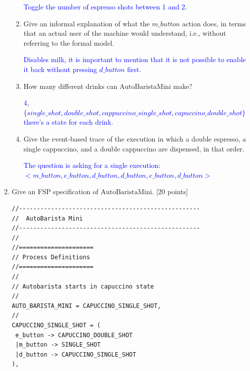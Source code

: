 \documentclass[12pt,fleqn]{article}
\begin{document}
\begin{enumerate}
\begin{enumerate}
\textcolor{blue}{Toggle the number of espresso shots between 1 and 2.}


\item Give an informal explanation of what the $m\_button$ action does, in terms that an actual user of the machine would understand, i.e., without referring to the formal model.

\textcolor{blue}{Disables milk, it is important to mention that it is not possible to enable it back without pressing $d\_button$ first.}


\item How many different drinks can $\mathrm{AutoBaristaMini}$ make?

\textcolor{blue}{4, $\{single\_shot, double\_shot, cappuccino\_single\_shot, capuccino\_double\_shot\}$ there's a state for each drink.}


\item Give the event-based trace of the execution in which a double espresso, a single cappuccino, and a double cappuccino are dispensed, in that order.

  \textcolor{blue}{The question is asking for a single execution: \\
    $<m\_button, e\_button, d\_button, d\_button, e\_button, d\_button>$
  }  
\end{enumerate}

\clearpage

\item Give an FSP specification of $\mathrm{AutoBaristaMini}$. [20 points]

\color{blue}
\begin{verbatim}
//---------------------------------------------------
//  AutoBarista Mini
//---------------------------------------------------
//
//=====================
// Process Definitions
//=====================
//
// Autobarista starts in capuccino state
//
AUTO_BARISTA_MINI = CAPUCCINO_SINGLE_SHOT,
//
CAPUCCINO_SINGLE_SHOT = (
 e_button -> CAPUCCINO_DOUBLE_SHOT
 |m_button -> SINGLE_SHOT
 |d_button -> CAPUCCINO_SINGLE_SHOT 
),


\end{verbatim}
\end{enumerate}
\end{document}
